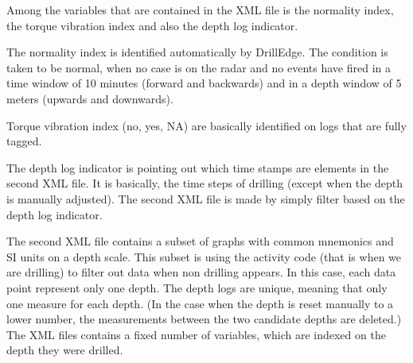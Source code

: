 \documentclass{article}
\theoremstyle{theorem}
\theoremstyle{definition}
\begin{document}
Among the variables that are contained in the XML file is the normality index, the torque vibration index and also the depth log indicator.

The normality index is identified automatically by DrillEdge. The condition is taken to be normal, when no case is on the radar and no events have fired in a time window of 10 minutes (forward and backwards) and in a depth window of 5 meters (upwards and downwards).

Torque vibration index (no, yes, NA) are basically identified on logs that are fully tagged. 

The depth log indicator is pointing out which time stamps are elements in the second XML file. It is basically, the time steps of drilling (except when the depth is manually adjusted). The second XML file is made by simply filter based on the depth log indicator.

The second XML file contains a subset of graphs with common mnemonics and SI units on a depth scale. This subset is using the activity code (that is when we are drilling) to filter out data when non drilling appears. In this case, each data point represent only one depth. The depth logs are unique, meaning that only one measure for each depth. (In the case when the depth is reset manually to a lower number, the measurements between the two candidate depths are deleted.) The XML files contains a fixed number of variables, which are indexed on the depth they were drilled.

%
%
\end{document}
